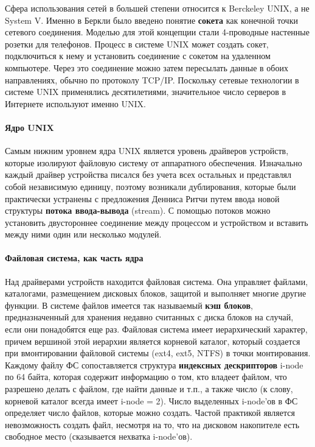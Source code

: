\documentclass[11pt]{article}
\begin{document}
	Сфера использования сетей в большей степени относится к Berckeley UNIX, а не System V. Именно в Беркли было введено понятие \textbf{сокета} как конечной точки сетевого соединения. Моделью для этой концепции стали 4-проводные настенные розетки для телефонов. Процесс в системе UNIX может создать сокет, подключиться к нему и установить соединение с сокетом на удаленном компьютере. Через это соединение можно затем пересылать данные в обоих направлениях, обычно по протоколу TCP/IP. Поскольку сетевые технологии в системе UNIX применялись десятилетиями, значительное число серверов в Интернете используют именно UNIX.
	\paragraph{Ядро UNIX}
	Самым нижним уровнем ядра UNIX является уровень драйверов устройств, которые изолируют файловую систему от аппаратного обеспечения. Изначально каждый драйвер устройства писался без учета всех остальных и представлял собой независимую единицу, поэтому возникали дублирования, которые были практически устранены с предложения Денниса Ритчи путем ввода новой структуры \textbf{потока ввода-вывода} (stream). С помощью потоков можно установить двустороннее соединение между процессом и устройством и вставить между ними один или несколько модулей.

	\paragraph{Файловая система, как часть ядра}
	Над драйверами устройств находится файловая система. Она управляет файлами, каталогами, размещением дисковых блоков, защитой и выполняет многие другие функции. В системе файлов имеется так называемый \textbf{кэш блоков}, предназначенный для хранения недавно считанных с диска блоков на случай, если они понадобятся еще раз. Файловая система имеет иерархический характер, причем вершиной этой иерархии является корневой каталог, который создается при вмонтировании файловой системы (ext4, ext5, NTFS) в точки монтирования. Каждому файлу ФС сопоставляется структура \textbf{индексных дескрипторов} i-node по 64 байта, которая содержит информацию о том, кто владеет файлом, что разрешено делать с файлом, где найти данные и т.п., а также число (к слову, корневой каталог всегда имеет i-node = 2). Число выделенных i-node'ов в ФС определяет число файлов, которые можно создать. Частой практикой является невозможность создать файл, несмотря на то, что на дисковом накопителе есть свободное место (сказывается нехватка i-node'ов).
\end{document}
